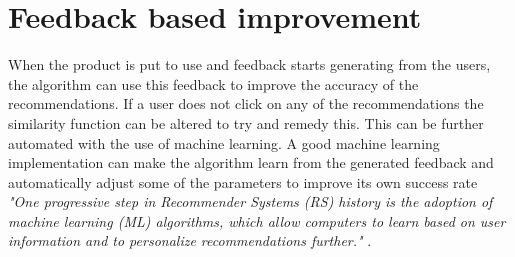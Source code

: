 \section{Feedback based improvement}
When the product is put to use and feedback starts generating from the users, the algorithm can use this feedback to improve the accuracy of the recommendations. If a user does not click on any of the recommendations the similarity function can be altered to try and remedy this. This can be further automated with the use of machine learning. A good machine learning implementation can make the algorithm learn from the generated feedback and automatically adjust some of the parameters to improve its own success rate \textit{"One  progressive  step  in  Recommender Systems (RS) history  is  the  adoption  of  machine  learning  (ML) algorithms, which allow computers to learn based on user information and to personalize recommendations  further."} \cite{RSAndML}. 

